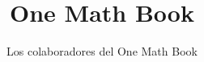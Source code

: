 \documentclass[11pt,a4paper,twoside,openany]{book}
\title{One Math Book}
\author{Los colaboradores del One Math Book}
\date{\bookdate}
\begin{document}
\frontmatter



\tableofcontents

\mainmatter



\appendix
\part{\omsolutionspart}


\backmatter
\printindex
\end{document}
